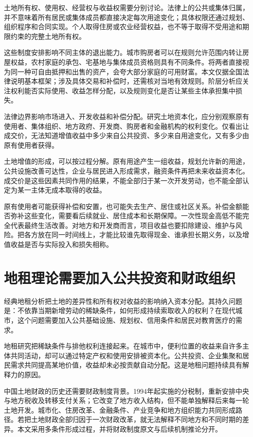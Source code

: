 \documentclass[UTF8,fontset=fandol,zihao=-4,oneside,openany]{ctexbook}
\begin{document}
\label{arg:P117}
土地所有权、使用权、经营权与收益权需要分别讨论。法律上的公共或集体归属，并不意味着所有居民或集体成员都直接决定每次用途变化；具体权限还通过规划、组织程序和合同实现。个人取得住房或农业经营权益，也不等于取得不受用途和期限约束的完整土地所有权。

这些制度安排影响不同主体的退出能力。城市购房者可以在规则允许范围内转让房屋权益，农村家庭的承包、宅基地与集体成员资格则具有不同条件。将两者直接视为同一种可自由抵押和出售的资产，会夸大部分家庭的可用财富。本文仅据全国法律说明基本框架；涉及具体交易和补偿时，还需核对当地有效规则。阶层分析应关注权利能否实际使用、收益怎样分配，以及规则变化是否让某些主体承担集中损失。

法律边界影响市场进入、开发收益和补偿分配。研究土地资本化，应分别观察原有使用者、集体组织、地方政府、开发商、购房者和金融机构的权利变化。仅看出让成交价，无法知道增值收益中多少来自公共投资、多少来自用途变化，又有多少由原有使用者获得。

\label{arg:P118}
土地增值的形成，可以按过程分解。原有用途产生一组收益，规划允许新的用途，公共设施改善可达性，企业与居民进入形成需求，融资条件再把未来收益资本化。成交价是这些因素共同作用的结果，不能全部归于某一次开发劳动，也不能全部认定为某一主体无成本取得的收益。

原有使用者可能获得补偿和安置，也可能失去生产、居住或社区关系。补偿金额能否弥补这些变化，需要看后续就业、居住成本和长期保障。一次性现金高低不能完全代表最终生活改善。对地方和开发商而言，项目收益也要扣除建设、维护与风险。把各方放在同一时间线上，才能比较谁先取得现金、谁承担长期义务，以及增值收益是否与实际投入和损失相称。

\section{地租理论需要加入公共投资和财政组织}
经典地租分析把土地的差异性和所有权对收益的影响纳入资本分配。其持久问题是：不依靠当期新增劳动的稀缺条件，如何形成持续索取收入的权利？在现代城市，这个问题需要加入公共基础设施、规划权、信用条件和居民对教育医疗的需求。\cite{Marx3}

\label{arg:P119}
地租研究把稀缺条件与排他权利连接起来。在城市中，便利位置的收益来自许多主体共同活动，却可以通过特定产权和使用安排被资本化。公共投资、企业集聚和居民需求共同提高某地价值，收益却未必按贡献自动分配。这是地租问题持续具有解释力的原因。

中国土地财政的历史还需要财政制度背景。1994年起实施的分税制，重新安排中央与地方税收及转移支付关系；它改变了地方收入结构，但不能单独解释后来每一轮土地开发。城市化、住房改革、金融条件、产业竞争和地方组织能力共同形成路径。若把土地财政全部归因于一次财政改革，就无法解释不同地方和不同时期的差异。本文采用多条件形成过程，并将财政制度原文与后续机制推论分开。\cite{Tax1994}
\end{document}
